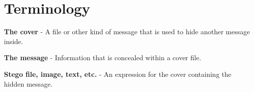 \section*{Terminology}
\noindent\textbf{The cover} - A file or other kind of message that is used to hide another message inside.


\noindent\textbf{The message} - Information that is concealed within a cover file.


\noindent\textbf{Stego file, image, text, etc.} - An expression for the cover containing the hidden message.